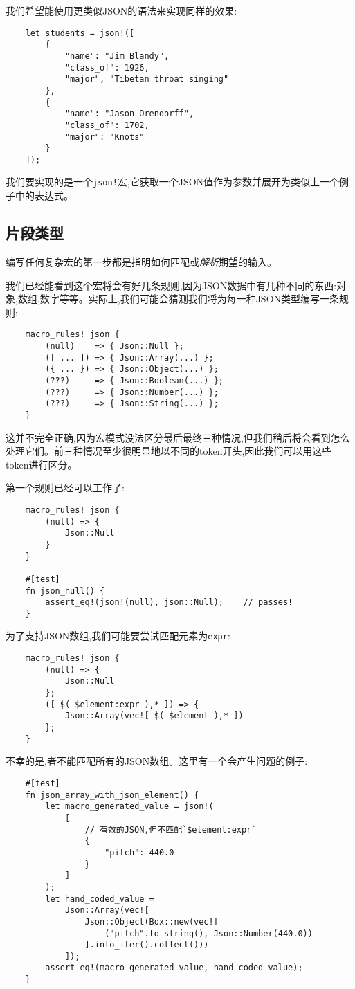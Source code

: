 我们希望能使用更类似JSON的语法来实现同样的效果:
\begin{verbatim}
    let students = json!([
        {
            "name": "Jim Blandy",
            "class_of": 1926,
            "major", "Tibetan throat singing"
        },
        {
            "name": "Jason Orendorff",
            "class_of": 1702,
            "major": "Knots"
        }
    ]);
\end{verbatim}

我们要实现的是一个\texttt{json!}宏,它获取一个JSON值作为参数并展开为类似上一个例子中的表达式。

\subsection{片段类型}\label{FragType}
编写任何复杂宏的第一步都是指明如何匹配或\emph{解析}期望的输入。

我们已经能看到这个宏将会有好几条规则,因为JSON数据中有几种不同的东西:对象,数组,数字等等。实际上,我们可能会猜测我们将为每一种JSON类型编写一条规则:
\begin{verbatim}
    macro_rules! json {
        (null)    => { Json::Null };
        ([ ... ]) => { Json::Array(...) };
        ({ ... }) => { Json::Object(...) };
        (???)     => { Json::Boolean(...) };
        (???)     => { Json::Number(...) };
        (???)     => { Json::String(...) };
    }
\end{verbatim}

这并不完全正确,因为宏模式没法区分最后最终三种情况,但我们稍后将会看到怎么处理它们。前三种情况至少很明显地以不同的token开头,因此我们可以用这些token进行区分。

第一个规则已经可以工作了:
\begin{verbatim}
    macro_rules! json {
        (null) => {
            Json::Null
        }
    }

    #[test]
    fn json_null() {
        assert_eq!(json!(null), json::Null);    // passes!
    }
\end{verbatim}

为了支持JSON数组,我们可能要尝试匹配元素为\texttt{expr}:
\begin{verbatim}
    macro_rules! json {
        (null) => {
            Json::Null
        };
        ([ $( $element:expr ),* ]) => {
            Json::Array(vec![ $( $element ),* ])
        };
    }
\end{verbatim}

不幸的是,者不能匹配所有的JSON数组。这里有一个会产生问题的例子:
\begin{verbatim}
    #[test]
    fn json_array_with_json_element() {
        let macro_generated_value = json!(
            [
                // 有效的JSON,但不匹配`$element:expr`
                {
                    "pitch": 440.0
                }
            ]
        );
        let hand_coded_value =
            Json::Array(vec![
                Json::Object(Box::new(vec![
                    ("pitch".to_string(), Json::Number(440.0))
                ].into_iter().collect()))
            ]);
        assert_eq!(macro_generated_value, hand_coded_value);
    }
\end{verbatim}


